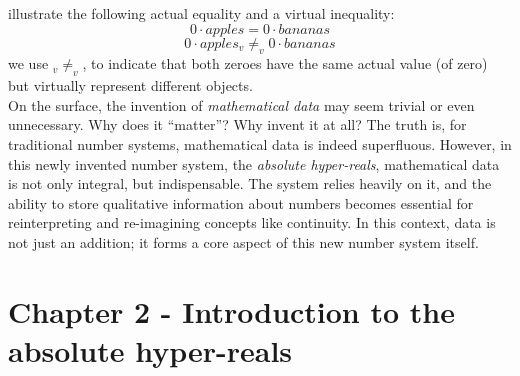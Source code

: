 \documentclass{article}
\begin{document}
illustrate the following actual equality and a virtual inequality: $$0\cdot apples=0\cdot bananas$$ $$0\cdot apples_v\neq_v0\cdot bananas$$  we use $_v\neq_v$, to indicate that both zeroes have the same actual value (of zero) but virtually represent different objects.\\On the surface, the invention of \emph{mathematical data} may seem trivial or even unnecessary. Why does it ``matter''? Why invent it at all? The truth is, for traditional number systems, mathematical data is indeed superfluous. However, in this newly invented number system, the \emph{absolute hyper-reals}, mathematical data is not only integral, but indispensable. The system relies heavily on it, and the ability to store qualitative information about numbers becomes essential for reinterpreting and re-imagining concepts like continuity. In this context, data is not just an addition; it forms a core aspect of this new number system itself.

\newpage \section{Chapter 2 - Introduction to the absolute hyper-reals}
\end{document}
